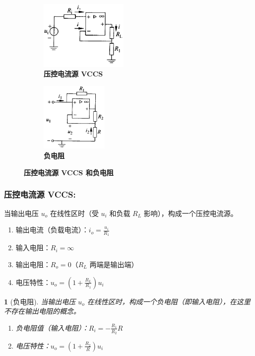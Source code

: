 \documentclass[UTF8]{report}
\theoremstyle{MyLineTheoremStyle} %
\theoremstyle{MyBlockTheoremStyle} %
\theoremstyle{MySubsubsectionStyle} %
\newtheorem{definition}{}
\begin{document}
\begin{figure}[H]\centering
\begin{subfigure}[t]{0.37\textwidth}\centering
    \includegraphics[height=95pt]{assets/1,2/压控电流源.png}
    \caption{\bfseries 压控电流源 VCCS}
\end{subfigure}\begin{subfigure}[t]{0.37\textwidth}\centering
    \includegraphics[height=95pt]{assets/1,2/负电阻.png}
    \caption{\bfseries  负电阻}
\end{subfigure}
\caption{\bfseries 压控电流源 VCCS 和负电阻 }
\end{figure}


\subsubsection{压控电流源 VCCS: }
当输出电压 $u_o$ 在线性区时（受 $u_i$ 和负载 $R_L$ 影响），构成一个压控电流源。
\begin{enumerate}
\item 输出电流（负载电流）：$i_o = \frac{u_i}{R_1}$
\item 输入电阻：$R_i = \infty$
\item 输出电阻：$R_o =  0$（$R_L$ 两端是输出端）
\item 电压特性：$u_o = (1+\frac{R_L}{R_1})u_i$
\end{enumerate}


\begin{definition}[负电阻]
当输出电压 $u_o$ 在线性区时，构成一个负电阻（即输入电阻），在这里不存在输出电阻的概念。
\begin{enumerate}
\item 负电阻值（输入电阻）：$R_i = -\frac{R_1}{R_2}R$
\item 电压特性：$u_o = (1+\frac{R_2}{R})u_i$
\end{enumerate}
\end{definition}
\end{document}
